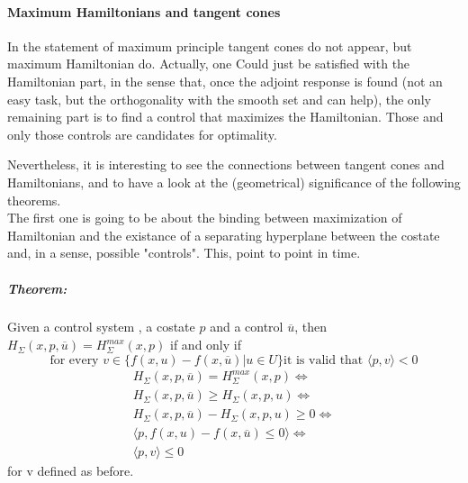 \paragraph[5.12-5.14]{Maximum Hamiltonians and tangent cones}
In the statement of maximum principle tangent cones do not appear, but maximum Hamiltonian do. Actually, one Could just be satisfied with the Hamiltonian part, in the sense that, once the adjoint response is found (not an easy task, but the orthogonality with the smooth set \so and \sz can help), the only remaining part is to find a control that maximizes the Hamiltonian. Those and only those controls are candidates for optimality. 

Nevertheless, it is interesting to see the connections between tangent cones and Hamiltonians, and to have a look at the (geometrical) significance of the following theorems.\\
The first one is going to be about the binding between maximization of Hamiltonian and the existance of a separating hyperplane between the costate and, in a sense, possible "controls". This, point to point in time. 

\subparagraph[5.12]{Theorem:}Given a control system \controlSystem, a costate $p$ and a control $\overline{u}$, then\\
$H_\Sigma(x,p,\overline{u})=H_{\Sigma}^{max}(x,p)$ if and only if 
\[ \text{for every }v\in\{f(x,u)-f(x,\overline{u})|u\in U \}\text{it is valid that }\langle p,v \rangle <0 \]
\begin{gather*}
	H_\Sigma(x,p,\overline{u})=H_{\Sigma}^{max}(x,p) \iff\\
	H_\Sigma(x,p,\overline{u})\ge H_\Sigma(x,p,u) \iff \\
	H_\Sigma(x,p,\overline{u})- H_\Sigma(x,p,u) \ge0 \iff\\
	\langle p,f(x,u)-f(x,\overline{u}) \le 0\rangle \iff\\
	\langle p,v \rangle \leq 0
\end{gather*}
for v defined as before. \\



